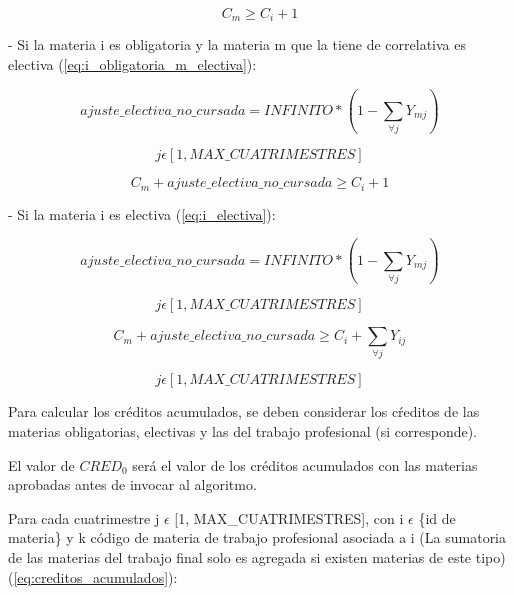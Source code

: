 \documentclass[a4paper]{article}
\begin{document}
\begin{equation}\label{eq:i_obligatoria_m_obligatoria}
C_m \geq C_i + 1
\end{equation}

- Si la materia i es obligatoria y la materia m que la tiene de correlativa es electiva (\ref{eq:i_obligatoria_m_electiva}):

\begin{equation}
ajuste\_electiva\_no\_cursada = INFINITO * (1 - \sum_{\forall j} Y_{mj})
\end{equation}

\begin{equation}
j \epsilon [1, MAX\_CUATRIMESTRES]
\end{equation}

\begin{equation}\label{eq:i_obligatoria_m_electiva}
C_m + ajuste\_electiva\_no\_cursada \geq C_i + 1
\end{equation}

- Si la materia i es electiva (\ref{eq:i_electiva}):

\begin{equation}
ajuste\_electiva\_no\_cursada = INFINITO * (1 - \sum_{\forall j} Y_{mj})
\end{equation}

\begin{equation}
j \epsilon [1, MAX\_CUATRIMESTRES]
\end{equation}

\begin{equation}\label{eq:i_electiva}
C_m + ajuste\_electiva\_no\_cursada \geq C_i + \sum_{\forall j} Y_{ij}
\end{equation}

\begin{equation}
j \epsilon [1, MAX\_CUATRIMESTRES]
\end{equation}


Para calcular los créditos acumulados, se deben considerar los cŕeditos de las materias obligatorias, electivas y las del trabajo profesional (si corresponde).

El valor de $CRED_0$ será el valor de los créditos acumulados con las materias aprobadas antes de invocar al algoritmo.\newline

Para cada cuatrimestre j $\epsilon$ [1, MAX\_CUATRIMESTRES], con i $\epsilon$ \{id de materia\} y k código de materia de trabajo profesional asociada a i (La sumatoria de las materias del trabajo final solo es agregada si existen materias de este tipo) (\ref{eq:creditos_acumulados}):
\end{document}
